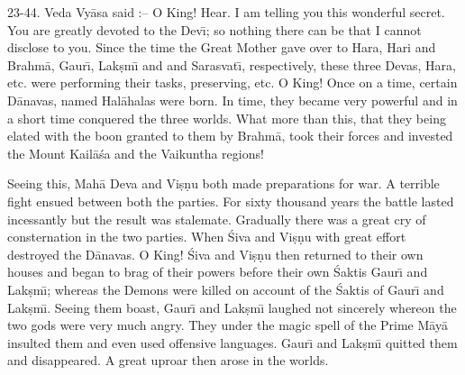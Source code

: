 23-44. Veda Vy\=asa said :-- O King! Hear. I am telling you this wonderful secret. You are greatly devoted to the Dev\={\i}; so nothing there can be that I cannot disclose to you. Since the time the Great Mother gave over to Hara, Hari and Brahm\=a, Gaur\={\i}, Lak\d{s}m\={\i} and and Sarasvat\={\i}, respectively, these three Devas, Hara, etc. were performing their tasks, preserving, etc. O King! Once on a time, certain D\=anavas, named Hal\=ahalas were born. In time, they became very powerful and in a short time conquered the three worlds. What more than this, that they being elated with the boon granted to them by Brahm\=a, took their forces and invested the Mount Kail\=a\'sa and the Vaikuntha regions!

Seeing this, Mah\=a Deva and Vi\d{s}\d{n}u both made preparations for war. A terrible fight ensued between both the parties. For sixty thousand years the battle lasted incessantly but the result was stalemate. Gradually there was a great cry of consternation in the two parties. When \'Siva and Vi\d{s}\d{n}u with great effort destroyed the D\=anavas. O King! \'Siva and Vi\d{s}\d{n}u then returned to their own houses and began to brag of their powers before their own \'Saktis Gaur\={\i} and Lak\d{s}m\={\i}; whereas the Demons were killed on account of the \'Saktis of Gaur\={\i} and Lak\d{s}m\={\i}. Seeing them boast, Gaur\={\i} and Lak\d{s}m\={\i} laughed not sincerely whereon the two gods were very much angry. They under the magic spell of the Prime M\=ay\=a insulted them and even used offensive languages. Gaur\={\i} and Lak\d{s}m\={\i} quitted them and disappeared. A great uproar then arose in the worlds.

